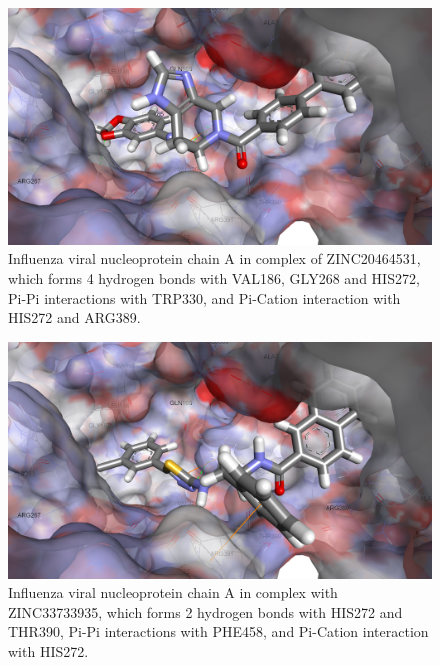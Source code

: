 \begin{figure}
\centering
\includegraphics[width=\linewidth]{Case/2IQH-ZINC20464531.png}
\caption{Influenza viral nucleoprotein chain A in complex of ZINC20464531, which forms 4 hydrogen bonds with VAL186, GLY268 and HIS272, Pi-Pi interactions with TRP330, and Pi-Cation interaction with HIS272 and ARG389.}
\label{Case:2IQH-ZINC20464531}
\end{figure}

\begin{figure}
\centering
\includegraphics[width=\linewidth]{Case/2IQH-ZINC33733935.png}
\caption{Influenza viral nucleoprotein chain A in complex with ZINC33733935, which forms 2 hydrogen bonds with HIS272 and THR390, Pi-Pi interactions with PHE458, and Pi-Cation interaction with HIS272.}
\label{Case:2IQH-ZINC33733935}
\end{figure}

